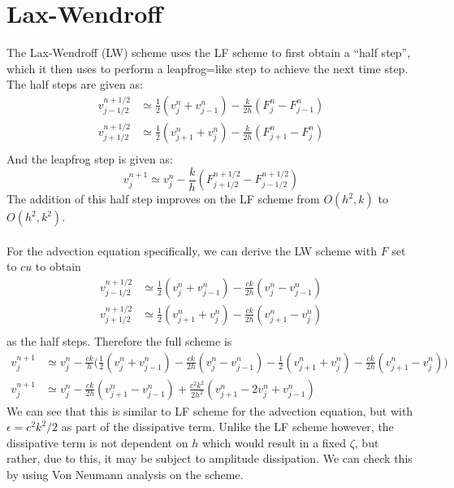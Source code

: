\section{Lax-Wendroff}
The Lax-Wendroff (LW) scheme uses the LF scheme to first obtain a ``half step'', which it then uses to perform a leapfrog=like step to achieve the next time step. The half steps are given as:
\begin{equation*}
  \begin{align}
  v^{n+1/2}_{j-1/2} &\simeq \frac{1}{2}(v^n_j + v^n_{j-1}) - \frac{k}{2h}(F^n_j-F^n_{j-1})\\
  v^{n+1/2}_{j+1/2} &\simeq \frac{1}{2}(v^n_{j+1} + v^n_j) - \frac{k}{2h}(F^n_{j+1}-F^n_j)\\
  \end{align}
\end{equation*}
And the leapfrog step is given as:
\begin{equation*}
  v^{n+1}_j \simeq v^n_j-\frac{k}{h}(F^{n+1/2}_{j+1/2}-F^{n+1/2}_{j-1/2})
\end{equation*}
The addition of this half step improves on the LF scheme from $O(h^2,k)$ to $O(h^2,k^2)$.
\\
\\
For the advection equation specifically, we can derive the LW scheme with $F$ set to $cu$ to obtain
\begin{equation*}
\begin{align}
  v^{n+1/2}_{j-1/2} &\simeq \frac{1}{2}(v^n_j + v^n_{j-1}) - \frac{ck}{2h}(v^n_j-v^n_{j-1})\\
  v^{n+1/2}_{j+1/2} &\simeq \frac{1}{2}(v^n_{j+1} + v^n_j) - \frac{ck}{2h}(v^n_{j+1}-v^n_j)\\
\end{align}
\end{equation*}
as the half steps. Therefore the full scheme is
\begin{equation*}
\begin{align}
  v^{n+1}_j &\simeq v^n_j-\frac{ck}{h}\big(\frac{1}{2}(v^n_j + v^n_{j-1}) - \frac{ck}{2h}(v^n_j-v^n_{j-1})- \frac{1}{2}(v^n_{j+1} + v^n_j) - \frac{ck}{2h}(v^n_{j+1}-v^n_j)\big)\\  
  v^{n+1}_j &\simeq v^n_j-\frac{ck}{2h}(v^n_{j+1} - v^n_{j-1}) + \frac{c^2k^2}{2h^2}(v^n_{j+1} -2v^n_j + v^n_{j-1})
\end{align}
\end{equation*}
We can see that this is similar to LF scheme for the advection equation, but with $\epsilon=c^2k^2/2$ as part of the dissipative term. Unlike the LF scheme however, the dissipative term is not dependent on $h$ which would result in a fixed $\zeta$, but rather, due to this, it may be subject to amplitude dissipation. We can check this by using Von Neumann analysis on the scheme.
